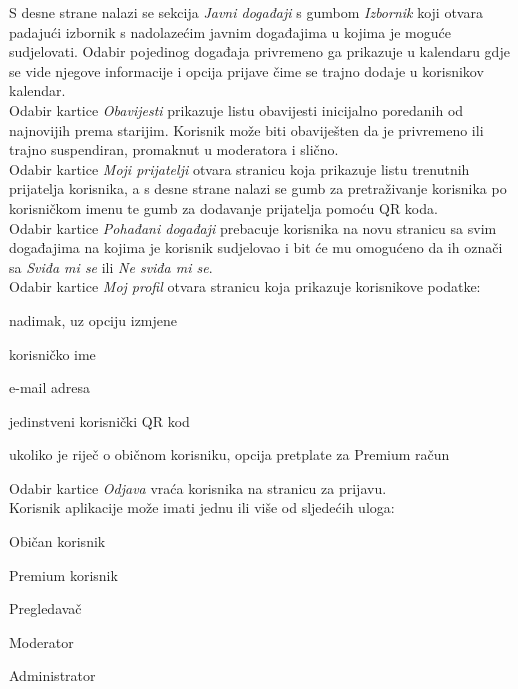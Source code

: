 		\indent S desne strane nalazi se sekcija \textit{Javni događaji} s gumbom \textit{Izbornik} koji otvara padajući izbornik s nadolazećim javnim događajima u kojima je moguće sudjelovati. Odabir pojedinog događaja privremeno ga prikazuje u kalendaru gdje se vide njegove informacije i opcija prijave čime se trajno dodaje u korisnikov kalendar. \\
		
		\indent Odabir kartice \textit{Obavijesti} prikazuje listu obavijesti inicijalno poredanih od najnovijih prema starijim. Korisnik može biti obaviješten da je privremeno ili trajno suspendiran, promaknut u moderatora i slično. \\
		
		\indent Odabir kartice \textit{Moji prijatelji} otvara stranicu koja prikazuje listu trenutnih prijatelja korisnika, a s desne strane nalazi se gumb za pretraživanje korisnika po korisničkom imenu te gumb za dodavanje prijatelja pomoću QR koda. \\
		
		\indent Odabir kartice \textit{Pohađani događaji} prebacuje korisnika na novu stranicu sa svim događajima na kojima je korisnik sudjelovao i bit će mu omogućeno da ih označi sa \textit{Sviđa mi se} ili \textit{Ne sviđa mi se}. \\
		
		\indent Odabir kartice \textit{Moj profil} otvara stranicu koja prikazuje korisnikove podatke:
		
		\begin{packed_item}
			\item nadimak, uz opciju izmjene
			\item korisničko ime
			\item e-mail adresa
			\item jedinstveni korisnički QR kod
			\item ukoliko je riječ o običnom korisniku, opcija pretplate za Premium račun
		\end{packed_item}
		
		\indent Odabir kartice \textit{Odjava} vraća korisnika na stranicu za prijavu. \\
		
		\indent Korisnik aplikacije može imati jednu ili više od sljedećih uloga:
		
		\begin{packed_item}
			\item Običan korisnik
			\item Premium korisnik
			\item Pregledavač
			\item Moderator
			\item Administrator
		\end{packed_item}
	
